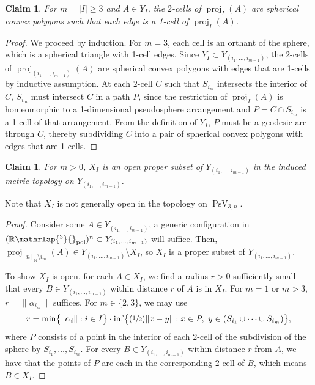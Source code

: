 \documentclass[JEP,XML,SOM,Unicode,NoFloatCountersInSection,published]{cedram}
\let\nicefrac\sfrac
\newtheorem{claim}[theorem]{Claim}
\theoremstyle{remark}
\let\mb\mathbb
\DeclareMathOperator{\pstief}{PsV}
\newcommand{\Rpol}[1]{\mb{R}\mathrlap{{}^{#1}}{}_\text{pol}}
\DeclareMathOperator{\proj}{proj}
\begin{document}
\begin{claim}\label{claim-sphericonvex}
For $m = |I| \geq 3$ and $A \in Y_I$, the $2$-cells of $\proj_I({A})$ are spherical convex polygons such that each edge is a 1-cell of $\proj_I({A})$.
\end{claim}

\begin{proof}
We proceed by induction. For $m=3$, each cell is an orthant of the sphere, which is a spherical triangle with 1-cell edges. Since $Y_I \subset Y_{(i_1,\dots,i_{m-1})}$, the $2$-cells of $\proj_{(i_1,\dots,i_{m-1})}(A)$ are spherical convex polygons with edges that are 1-cells by inductive assumption. At each $2$-cell $C$ such that $S_{i_m}$ intersects the interior of $C$, $S_{i_m}$ must intersect $C$ in a path $P$, since the restriction of $\proj_I({A})$ is homeomorphic to a 1-dimensional pseudosphere arrangement and $P = C \cap S_{i_m}$ is a 1-cell of that arrangement.
From the definition of $Y_I$, $P$ must be a geodesic arc through $C$, thereby subdividing $C$ into a pair of spherical convex polygons with edges that are 1-cells.
\end{proof}

\begin{claim}\label{claim-open-X}
For $m > 0$, $X_I$ is an open proper subset of $Y_{(i_1,\dots,i_{m-1})}$ in the induced metric topology on $Y_{(i_1,\dots,i_{m-1})}$.
\end{claim}

Note that $X_I$ is not generally open in the topology on $\pstief_{3,n}$.

\begin{proof}
Consider some $A \in Y_{(i_1,\dots,i_{m-1})}$, a generic configuration in $(\Rpol{3})^n \subset Y_{(i_1,\dots,i_{m-1})}$ will suffice. Then, $\proj_{[n]_\mb{N}\setminus i_m}(A) \in Y_{(i_1,\dots,i_{m-1})} \setminus X_I$, so $X_I$ is a proper subset of $Y_{(i_1,\dots,i_{m-1})}$.

To show $X_I$ is open, for each $A \in X_I$, we find a radius $r>0$ sufficiently small that every $B \in Y_{(i_1,\dots,i_{m-1})}$ within distance $r$ of $A$ is in $X_I$.
For $m =1$ or $m>3$, $r = \|\alpha_{i_m}\|$ suffices.
For $m \in \{2,3\}$, we may use
\[ r = \min \bigl\{\|\alpha_i\|:i\in I \bigr\} \cdot \inf\bigl\{ (\nicefrac{1}{2}) \|x -y\|:x \in P,\ y \in (S_{i_1} \cup \dots \cup S_{i_m}) \bigr\}, \]
where $P$ consists of a point in the interior of each $2$-cell of the subdivision of the sphere by $S_{i_1},\dots,S_{i_m}$.
For every $B \in Y_{(i_1,\dots,i_{m-1})}$ within distance $r$ from $A$, we have that the points of $P$ are each in the corresponding $2$-cell of $B$, which means $B \in X_I$.
\end{proof}
\end{document}
